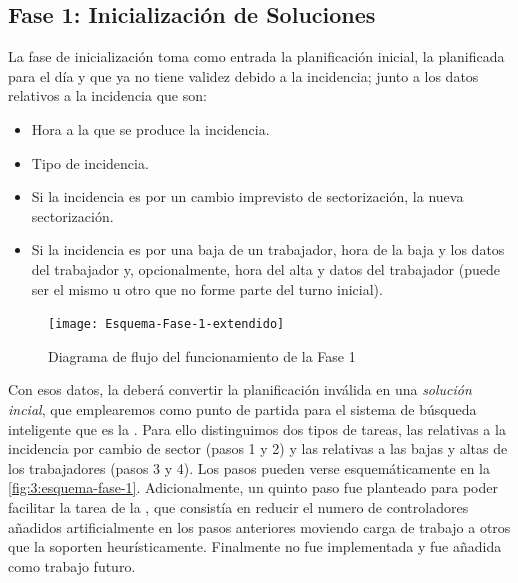 \subsection{Fase 1: Inicialización de Soluciones} \label{sec:3:inicializacion-soluciones}

La fase de inicialización toma como entrada la planificación inicial, la planificada para el día y que ya no tiene validez debido a la incidencia; junto a los datos relativos a la incidencia que son:

\begin{itemize}
	\item Hora a la que se produce la incidencia.
	\item Tipo de incidencia.
	\item Si la incidencia es por un cambio imprevisto de sectorización, la nueva sectorización.
	\item Si la incidencia es por una baja de un trabajador, hora de la baja y los datos del trabajador y, opcionalmente, hora del alta y datos del trabajador (puede ser el mismo u otro que no forme parte del turno inicial).
\end{itemize}

\begin{figure}[htbp]
	\centering
	\texttt{[image: Esquema-Fase-1-extendido]}
	\caption{Diagrama de flujo del funcionamiento de la Fase 1}
	\label{fig:3:esquema-fase-1}
\end{figure}

Con esos datos, la \faseuno{} deberá convertir la planificación inválida en una \textit{solución incial}, que 
emplearemos como punto de partida para el sistema de búsqueda inteligente que es la \fasedos{}. Para ello distinguimos dos tipos de tareas, las relativas a la incidencia por cambio de sector (pasos 1 y 2) y las relativas a las bajas y altas de los trabajadores (pasos 3 y 4). Los pasos pueden verse esquemáticamente en la \autoref{fig:3:esquema-fase-1}.
Adicionalmente, un quinto paso fue planteado para poder facilitar la tarea de la \fasedos{}, que consistía en reducir el numero de controladores añadidos artificialmente en los pasos anteriores moviendo carga de trabajo a otros que la soporten heurísticamente. Finalmente no fue implementada y fue añadida como trabajo futuro.
\\

